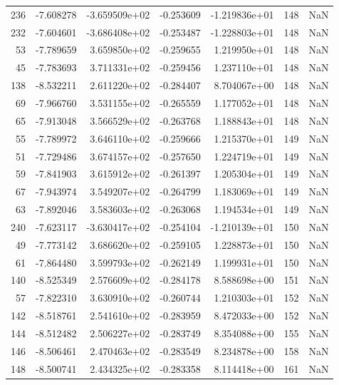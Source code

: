 \begin{tabular}{rrrrrrr}
 236 &  -7.608278 & -3.659509e+02 & -0.253609 & -1.219836e+01 &         148 & NaN \\
 232 &  -7.604601 & -3.686408e+02 & -0.253487 & -1.228803e+01 &         148 & NaN \\
  53 &  -7.789659 &  3.659850e+02 & -0.259655 &  1.219950e+01 &         148 & NaN \\
  45 &  -7.783693 &  3.711331e+02 & -0.259456 &  1.237110e+01 &         148 & NaN \\
 138 &  -8.532211 &  2.611220e+02 & -0.284407 &  8.704067e+00 &         148 & NaN \\
  69 &  -7.966760 &  3.531155e+02 & -0.265559 &  1.177052e+01 &         148 & NaN \\
  65 &  -7.913048 &  3.566529e+02 & -0.263768 &  1.188843e+01 &         148 & NaN \\
  55 &  -7.789972 &  3.646110e+02 & -0.259666 &  1.215370e+01 &         149 & NaN \\
  51 &  -7.729486 &  3.674157e+02 & -0.257650 &  1.224719e+01 &         149 & NaN \\
  59 &  -7.841903 &  3.615912e+02 & -0.261397 &  1.205304e+01 &         149 & NaN \\
  67 &  -7.943974 &  3.549207e+02 & -0.264799 &  1.183069e+01 &         149 & NaN \\
  63 &  -7.892046 &  3.583603e+02 & -0.263068 &  1.194534e+01 &         149 & NaN \\
 240 &  -7.623117 & -3.630417e+02 & -0.254104 & -1.210139e+01 &         150 & NaN \\
  49 &  -7.773142 &  3.686620e+02 & -0.259105 &  1.228873e+01 &         150 & NaN \\
  61 &  -7.864480 &  3.599793e+02 & -0.262149 &  1.199931e+01 &         150 & NaN \\
 140 &  -8.525349 &  2.576609e+02 & -0.284178 &  8.588698e+00 &         151 & NaN \\
  57 &  -7.822310 &  3.630910e+02 & -0.260744 &  1.210303e+01 &         152 & NaN \\
 142 &  -8.518761 &  2.541610e+02 & -0.283959 &  8.472033e+00 &         152 & NaN \\
 144 &  -8.512482 &  2.506227e+02 & -0.283749 &  8.354088e+00 &         155 & NaN \\
 146 &  -8.506461 &  2.470463e+02 & -0.283549 &  8.234878e+00 &         158 & NaN \\
 148 &  -8.500741 &  2.434325e+02 & -0.283358 &  8.114418e+00 &         161 & NaN \\

\end{tabular}
